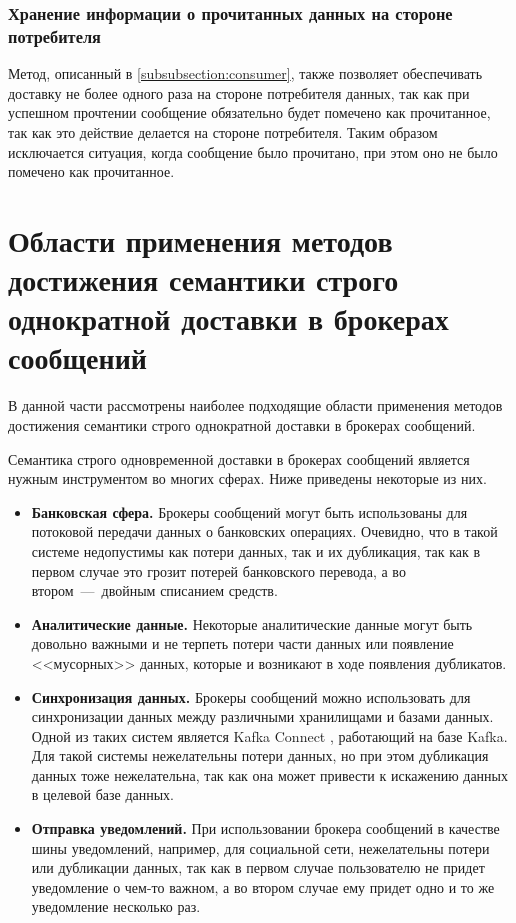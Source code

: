 \subsubsection{Хранение информации о прочитанных данных на стороне потребителя}
Метод, описанный в \ref{subsubsection:consumer}, также позволяет обеспечивать доставку не более одного раза на стороне потребителя данных, так как при успешном прочтении сообщение обязательно будет помечено как прочитанное, так как это действие делается на стороне потребителя. Таким образом исключается ситуация, когда сообщение было прочитано, при этом оно не было помечено как прочитанное.


\section{Области применения методов достижения семантики строго однократной доставки в брокерах сообщений}
В данной части рассмотрены наиболее подходящие области применения методов достижения семантики строго однократной доставки в брокерах сообщений.

Семантика строго одновременной доставки в брокерах сообщений является нужным инструментом во многих сферах. Ниже приведены некоторые из них.

\begin{itemize}
	\item \textbf{Банковская сфера.} Брокеры сообщений могут быть использованы для потоковой передачи данных о банковских операциях. Очевидно, что в такой системе недопустимы как потери данных, так и их дубликация, так как в первом случае это грозит потерей банковского перевода, а во втором~---~двойным списанием средств.
	\item \textbf{Аналитические данные.} Некоторые аналитические данные могут быть довольно важными и не терпеть потери части данных или появление <<мусорных>> данных, которые и возникают в ходе появления дубликатов.
	\item \textbf{Синхронизация данных.} Брокеры сообщений можно использовать для синхронизации данных между различными хранилищами и базами данных. Одной из таких систем является Kafka Connect \cite{bib:14}, работающий на базе Kafka. Для такой системы нежелательны потери данных, но при этом дубликация данных тоже нежелательна, так как она может привести к искажению данных в целевой базе данных.
	\item \textbf{Отправка уведомлений.} При использовании брокера сообщений в качестве шины уведомлений, например, для социальной сети, нежелательны потери или дубликации данных, так как в первом случае пользователю не придет уведомление о чем-то важном, а во втором случае ему придет одно и то же уведомление несколько раз.
\end{itemize}


